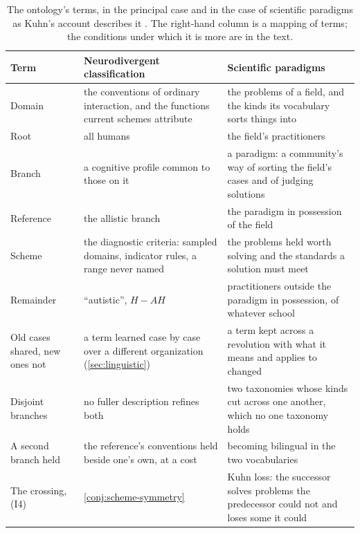 \begin{table}[t]
\centering
\small
\caption{The ontology's terms, in the principal case and in the case of scientific paradigms as Kuhn's account describes it \cite{Kuhn1962, OberheimHoyningenHuene2024}. The right-hand column is a mapping of terms; the conditions under which it is more are in the text.}
\label{tab:instances}
\begin{tabular}{@{}p{3.1cm}p{5.0cm}p{5.6cm}@{}}
\toprule
Term & Neurodivergent classification & Scientific paradigms \\
\midrule
Domain & the conventions of ordinary interaction, and the functions current schemes attribute & the problems of a field, and the kinds its vocabulary sorts things into \\
\addlinespace
Root & all humans & the field's practitioners \\
\addlinespace
Branch & a cognitive profile common to those on it & a paradigm: a community's way of sorting the field's cases and of judging solutions \\
\addlinespace
Reference & the allistic branch & the paradigm in possession of the field \\
\addlinespace
Scheme & the diagnostic criteria: sampled domains, indicator rules, a range never named & the problems held worth solving and the standards a solution must meet \\
\addlinespace
Remainder & ``autistic'', $H - AH$ & practitioners outside the paradigm in possession, of whatever school \\
\addlinespace
Old cases shared, new ones not & a term learned case by case over a different organization (\autoref{sec:linguistic}) & a term kept across a revolution with what it means and applies to changed \\
\addlinespace
Disjoint branches & no fuller description refines both & two taxonomies whose kinds cut across one another, which no one taxonomy holds \\
\addlinespace
A second branch held & the reference's conventions held beside one's own, at a cost & becoming bilingual in the two vocabularies \\
\addlinespace
The crossing, (I4) & \autoref{conj:scheme-symmetry} & Kuhn loss: the successor solves problems the predecessor could not and loses some it could \\
\bottomrule
\end{tabular}
\end{table}

